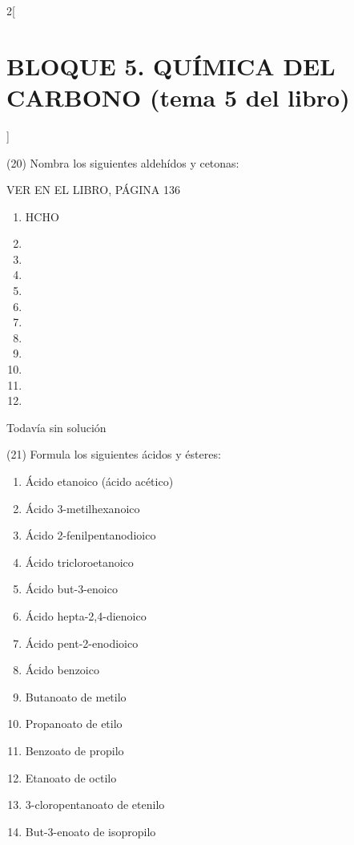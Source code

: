 \documentclass[10pt]{article}
\begin{document}
\begin{multicols}{2}[
  \section{BLOQUE 5. QUÍMICA DEL CARBONO (tema 5 del libro)}
  ]
\begin{exercise}
  (20) Nombra los siguientes aldehídos y cetonas:

  VER EN EL LIBRO, PÁGINA 136
  \begin{enumerate}
    \item HCHO
    \item {}
    \item {}
    \item {}
    \item {}
    \item {}
    \item {}
    \item {}
    \item {}
    \item {}
    \item {}
    \item {}
  \end{enumerate}

\end{exercise}

\begin{solution}[print=false]
  Todavía sin solución
\end{solution}

\begin{exercise}
  (21) Formula los siguientes ácidos y ésteres:
  \begin{enumerate}
    \item Ácido etanoico (ácido acético)
    \item Ácido 3-metilhexanoico
    \item Ácido 2-fenilpentanodioico
    \item Ácido tricloroetanoico
    \item Ácido but-3-enoico
    \item Ácido hepta-2,4-dienoico
    \item Ácido pent-2-enodioico
    \item Ácido benzoico
    \item Butanoato de metilo
    \item Propanoato de etilo
    \item Benzoato de propilo
    \item Etanoato de octilo
    \item 3-cloropentanoato de etenilo
    \item But-3-enoato de isopropilo
  \end{enumerate}
\end{exercise}


\end{multicols}
\end{document}
